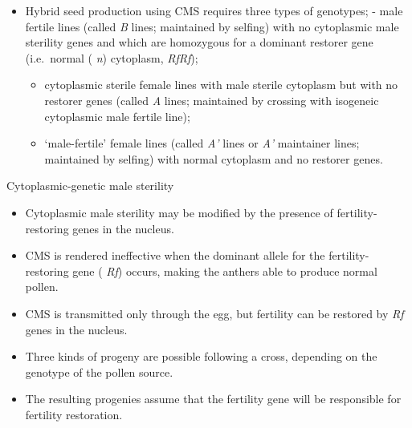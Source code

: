 \documentclass[11pt,ignorenonframetext,aspectratio=169]{beamer}
\providecommand{\tightlist}{%
  \setlength{\itemsep}{0pt}\setlength{\parskip}{0pt}}
\begin{document}
\begin{frame}{}
\protect\hypertarget{section-14}{}
\begin{itemize}
\tightlist
\item
  Hybrid seed production using CMS requires three types of genotypes; -
  male fertile lines (called \emph{B} lines; maintained by selfing) with
  no cytoplasmic male sterility genes and which are homozygous for a
  dominant restorer gene (i.e.~normal ( \emph{n}) cytoplasm,
  \emph{RfRf});

  \begin{itemize}
  \tightlist
  \item
    cytoplasmic sterile female lines with male sterile cytoplasm but
    with no restorer genes (called \emph{A} lines; maintained by
    crossing with isogeneic cytoplasmic male fertile line);
  \item
    `male-fertile' female lines (called \emph{A'} lines or \emph{A'}
    maintainer lines; maintained by selfing) with normal cytoplasm and
    no restorer genes.
  \end{itemize}
\end{itemize}
\end{frame}

\begin{frame}{Cytoplasmic-genetic male sterility}
\protect\hypertarget{cytoplasmic-genetic-male-sterility}{}
\begin{itemize}
\tightlist
\item
  Cytoplasmic male sterility may be modified by the presence of
  fertility-restoring genes in the nucleus.
\item
  CMS is rendered ineffective when the dominant allele for the
  fertility-restoring gene ( \emph{Rf}) occurs, making the anthers able
  to produce normal pollen.
\item
  CMS is transmitted only through the egg, but fertility can be restored
  by \emph{Rf} genes in the nucleus.
\item
  Three kinds of progeny are possible following a cross, depending on
  the genotype of the pollen source.
\item
  The resulting progenies assume that the fertility gene will be
  responsible for fertility restoration.
\end{itemize}
\end{frame}
\end{document}
